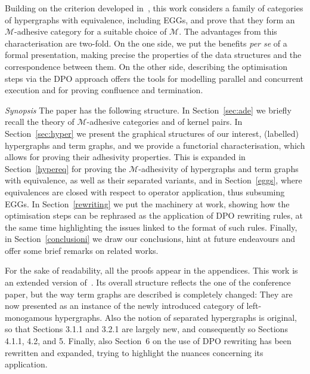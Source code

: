 \documentclass[3p]{elsarticle}
\theoremstyle{remark}
\theoremstyle{definition}
\begin{document}

Building on the criterion developed in~\cite{CastelnovoGM24}, this work considers a family of categories of hypergraphs
with equivalence, including EGGs, and prove that they form an 
$\mathcal{M}$-adhesive category for a suitable choice of $\mathcal{M}$.
The advantages from this characterisation are two-fold. On the one side, 
we put the benefits \emph{per se} of a formal presentation, making precise 
the properties of the data structures and the correspondence between them.
On the other side, describing the optimisation steps via the DPO approach
offers the tools for modelling  parallel and concurrent execution
and for proving  confluence and termination.

\emph{Synopsis}
The paper has the following structure. 
In Section~\ref{sec:ade} we briefly recall 
the theory of $\mathcal{M}$-adhesive categories
and of kernel pairs.
In Section~\ref{sec:hyper} we present the graphical structures of our interest, 
 (labelled) hypergraphs and term graphs, and we provide a
functorial characterisation, which allows for proving their adhesivity properties.
This is expanded in Section~\ref{hypereq} for proving the $\mathcal{M}$-adhesivity
of hypergraphs and term graphs with equivalence, as well as their separated variants,
and in Section~\ref{eggs}, where equivalences are closed with respect to operator application,
thus subsuming EGGs.
%
In Section~\ref{rewriting} we put the machinery at work, showing how the optimisation steps
can be rephrased as the application of DPO rewriting rules, at the same time
highlighting the issues linked to the format of such rules.
%
Finally, in Section~\ref{conclusioni} we draw our conclusions, hint at future endeavours and offer some 
brief remarks on related works.

For the sake of readability, all the proofs appear in the appendices. 
This work is an extended version of~\cite{uovadesive}.
Its overall structure reflects the one of the conference paper, 
but the way term graphs
are described is completely changed: They are now presented 
as an instance of the newly introduced category of 
left-monogamous hypergraphs. Also the notion of separated 
hypergraphs is original, so that Sections 3.1.1 and 3.2.1 are largely new,
and consequently so Sections 4.1.1, 4.2, and 5. 
%
Finally, also Section~6 on the use of DPO rewriting has been rewritten 
and expanded, trying to highlight the nuances concerning its application.
\end{document}
